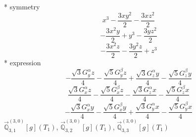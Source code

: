 \documentclass[fleqn,8pt]{jsarticle}
\begin{document}
\noindent\quad ** symmetry
\begin{dmath*}
x^{3} - \frac{3 x y^{2}}{2} - \frac{3 x z^{2}}{2}
\end{dmath*}
\begin{dmath*}
- \frac{3 x^{2} y}{2} + y^{3} - \frac{3 y z^{2}}{2}
\end{dmath*}
\begin{dmath*}
- \frac{3 x^{2} z}{2} - \frac{3 y^{2} z}{2} + z^{3}
\end{dmath*}
\noindent\quad ** expression
\begin{dmath*}
- \frac{\sqrt{3} G_{y}^{\alpha} z}{4} - \frac{\sqrt{5} G_{y}^{\beta} z}{4} + \frac{\sqrt{3} G_{z}^{\alpha} y}{4} - \frac{\sqrt{5} G_{z}^{\beta} y}{4}
\end{dmath*}
\begin{dmath*}
\frac{\sqrt{3} G_{x}^{\alpha} z}{4} - \frac{\sqrt{5} G_{x}^{\beta} z}{4} - \frac{\sqrt{3} G_{z}^{\alpha} x}{4} - \frac{\sqrt{5} G_{z}^{\beta} x}{4}
\end{dmath*}
\begin{dmath*}
- \frac{\sqrt{3} G_{x}^{\alpha} y}{4} - \frac{\sqrt{5} G_{x}^{\beta} y}{4} + \frac{\sqrt{3} G_{y}^{\alpha} x}{4} - \frac{\sqrt{5} G_{y}^{\beta} x}{4}
\end{dmath*}
\noindent\quad $\vec{\mathbb{Q}}_{3,1}^{(3,0)}[g](T_{1})$, $\vec{\mathbb{Q}}_{3,2}^{(3,0)}[g](T_{1})$, $\vec{\mathbb{Q}}_{3,3}^{(3,0)}[g](T_{1})$
\end{document}
